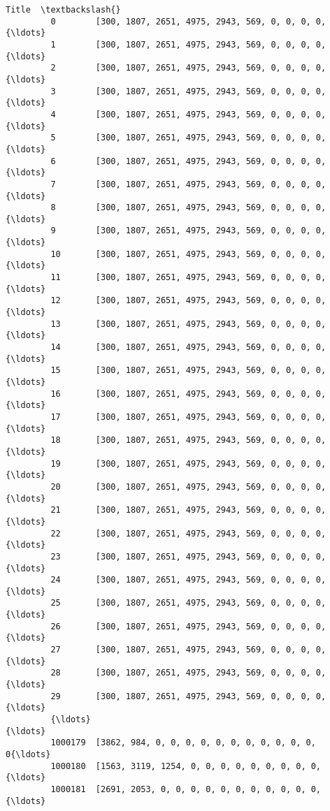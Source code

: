 \documentclass[11pt]{article}
\begin{document}
\begin{Verbatim}[commandchars=\\\{\}]
                                                              Title  \textbackslash{}
         0        [300, 1807, 2651, 4975, 2943, 569, 0, 0, 0, 0,{\ldots}   
         1        [300, 1807, 2651, 4975, 2943, 569, 0, 0, 0, 0,{\ldots}   
         2        [300, 1807, 2651, 4975, 2943, 569, 0, 0, 0, 0,{\ldots}   
         3        [300, 1807, 2651, 4975, 2943, 569, 0, 0, 0, 0,{\ldots}   
         4        [300, 1807, 2651, 4975, 2943, 569, 0, 0, 0, 0,{\ldots}   
         5        [300, 1807, 2651, 4975, 2943, 569, 0, 0, 0, 0,{\ldots}   
         6        [300, 1807, 2651, 4975, 2943, 569, 0, 0, 0, 0,{\ldots}   
         7        [300, 1807, 2651, 4975, 2943, 569, 0, 0, 0, 0,{\ldots}   
         8        [300, 1807, 2651, 4975, 2943, 569, 0, 0, 0, 0,{\ldots}   
         9        [300, 1807, 2651, 4975, 2943, 569, 0, 0, 0, 0,{\ldots}   
         10       [300, 1807, 2651, 4975, 2943, 569, 0, 0, 0, 0,{\ldots}   
         11       [300, 1807, 2651, 4975, 2943, 569, 0, 0, 0, 0,{\ldots}   
         12       [300, 1807, 2651, 4975, 2943, 569, 0, 0, 0, 0,{\ldots}   
         13       [300, 1807, 2651, 4975, 2943, 569, 0, 0, 0, 0,{\ldots}   
         14       [300, 1807, 2651, 4975, 2943, 569, 0, 0, 0, 0,{\ldots}   
         15       [300, 1807, 2651, 4975, 2943, 569, 0, 0, 0, 0,{\ldots}   
         16       [300, 1807, 2651, 4975, 2943, 569, 0, 0, 0, 0,{\ldots}   
         17       [300, 1807, 2651, 4975, 2943, 569, 0, 0, 0, 0,{\ldots}   
         18       [300, 1807, 2651, 4975, 2943, 569, 0, 0, 0, 0,{\ldots}   
         19       [300, 1807, 2651, 4975, 2943, 569, 0, 0, 0, 0,{\ldots}   
         20       [300, 1807, 2651, 4975, 2943, 569, 0, 0, 0, 0,{\ldots}   
         21       [300, 1807, 2651, 4975, 2943, 569, 0, 0, 0, 0,{\ldots}   
         22       [300, 1807, 2651, 4975, 2943, 569, 0, 0, 0, 0,{\ldots}   
         23       [300, 1807, 2651, 4975, 2943, 569, 0, 0, 0, 0,{\ldots}   
         24       [300, 1807, 2651, 4975, 2943, 569, 0, 0, 0, 0,{\ldots}   
         25       [300, 1807, 2651, 4975, 2943, 569, 0, 0, 0, 0,{\ldots}   
         26       [300, 1807, 2651, 4975, 2943, 569, 0, 0, 0, 0,{\ldots}   
         27       [300, 1807, 2651, 4975, 2943, 569, 0, 0, 0, 0,{\ldots}   
         28       [300, 1807, 2651, 4975, 2943, 569, 0, 0, 0, 0,{\ldots}   
         29       [300, 1807, 2651, 4975, 2943, 569, 0, 0, 0, 0,{\ldots}   
         {\ldots}                                                    {\ldots}   
         1000179  [3862, 984, 0, 0, 0, 0, 0, 0, 0, 0, 0, 0, 0, 0{\ldots}   
         1000180  [1563, 3119, 1254, 0, 0, 0, 0, 0, 0, 0, 0, 0, {\ldots}   
         1000181  [2691, 2053, 0, 0, 0, 0, 0, 0, 0, 0, 0, 0, 0, {\ldots}   

\end{Verbatim}
\end{document}
